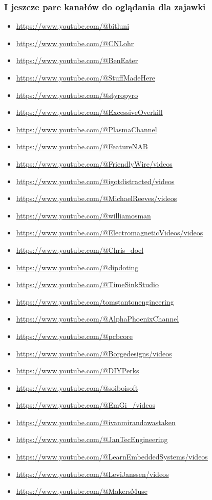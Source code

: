 \documentclass[b5paper, 10pt, twoside]{book}
\begin{document}
\subsubsection{I jeszcze pare kanałów do oglądania dla zajawki}
\begin{itemize}
  \item \url{https://www.youtube.com/@bitluni}
  \item \url{https://www.youtube.com/@CNLohr}
  \item \url{https://www.youtube.com/@BenEater}
  \item \url{https://www.youtube.com/@StuffMadeHere}
  \item \url{https://www.youtube.com/@styropyro}
  \item \url{https://www.youtube.com/@ExcessiveOverkill}
  \item \url{https://www.youtube.com/@PlasmaChannel}
  \item \url{https://www.youtube.com/@FeatureNAB}
  \item \url{https://www.youtube.com/@FriendlyWire/videos}
  \item \url{https://www.youtube.com/@igotdistracted/videos}
  \item \url{https://www.youtube.com/@MichaelReeves/videos}
  \item \url{https://www.youtube.com/@williamosman}
  \item \url{https://www.youtube.com/@ElectromagneticVideos/videos}
  \item \url{https://www.youtube.com/@Chris_doel}
  \item \url{https://www.youtube.com/@dipdoting}
  \item \url{https://www.youtube.com/@TimeSinkStudio}
  \item \url{https://www.youtube.com/tomstantonengineering}
  \item \url{https://www.youtube.com/@AlphaPhoenixChannel}
  \item \url{https://www.youtube.com/@pcbcore}
  \item \url{https://www.youtube.com/@Borgedesigns/videos}
  \item \url{https://www.youtube.com/@DIYPerks}
  \item \url{https://www.youtube.com/@soiboisoft}
  \item \url{https://www.youtube.com/@EmGi_/videos}
  \item \url{https://www.youtube.com/@ivanmirandawastaken}
  \item \url{https://www.youtube.com/@JanTecEngineering}
  \item \url{https://www.youtube.com/@LearnEmbeddedSystems/videos}
  \item \url{https://www.youtube.com/@LeviJanssen/videos}
  \item \url{https://www.youtube.com/@MakersMuse}
\end{itemize}
\end{document}

